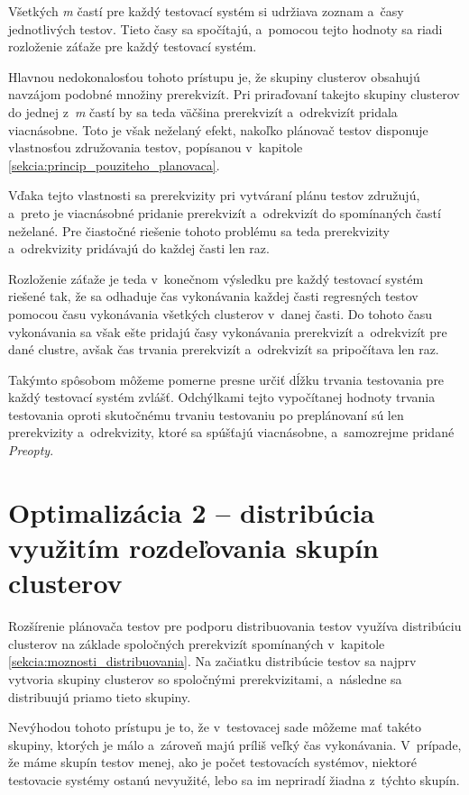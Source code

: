 Všetkých \textit{m} častí pre každý testovací systém si udržiava
zoznam a~časy jednotlivých testov. Tieto časy sa spočítajú, a~pomocou
tejto hodnoty sa riadi rozloženie záťaže pre každý testovací systém.

Hlavnou nedokonalosťou tohoto prístupu je, že skupiny clusterov obsahujú 
navzájom podobné množiny prerekvizít. Pri priraďovaní takejto skupiny clusterov
do jednej z~\textit{m} častí by sa teda väčšina prerekvizít a~odrekvizít
pridala viacnásobne. Toto je však neželaný efekt, nakoľko plánovač testov
disponuje vlastnosťou združovania testov, popísanou v~kapitole \ref{sekcia:princip_pouziteho_planovaca}.

Vďaka tejto vlastnosti sa prerekvizity pri vytváraní plánu testov združujú,
a~preto je viacnásobné pridanie prerekvizít a~odrekvizít do spomínaných častí neželané.
Pre čiastočné riešenie tohoto problému sa teda prerekvizity a~odrekvizity
pridávajú do každej časti len raz. 

Rozloženie záťaže je teda v~konečnom výsledku pre každý testovací systém 
riešené tak, že sa odhaduje čas vykonávania každej časti regresných testov
pomocou času vykonávania všetkých clusterov v~danej časti. Do tohoto času vykonávania 
sa však ešte pridajú časy vykonávania prerekvizít a~odrekvizít pre dané clustre,
avšak čas trvania prerekvizít a~odrekvizít sa pripočítava len raz.

Takýmto spôsobom môžeme pomerne presne určiť dĺžku trvania testovania
pre každý testovací systém zvlášť. Odchýlkami tejto vypočítanej hodnoty
trvania testovania oproti skutočnému trvaniu testovaniu po preplánovaní 
sú len prerekvizity a~odrekvizity, ktoré sa spúšťajú viacnásobne, a~samozrejme
pridané \textit{Preopty}. 


\section{Optimalizácia 2 -- distribúcia využitím rozdeľovania skupín clusterov}
\label{sekcia:optimalizacia2}
Rozšírenie plánovača testov pre podporu distribuovania testov využíva 
distribúciu clusterov na základe spoločných prerekvizít spomínaných v~kapitole 
\ref{sekcia:moznosti_distribuovania}.
Na začiatku distribúcie testov sa najprv vytvoria skupiny clusterov so spoločnými
prerekvizitami, a~následne sa distribuujú priamo tieto skupiny. 

Nevýhodou tohoto prístupu je to, že v~testovacej sade môžeme mať takéto skupiny,
ktorých je málo a~zároveň majú príliš veľký čas vykonávania. V~prípade, že máme
skupín testov menej, ako je počet testovacích systémov, niektoré testovacie 
systémy ostanú nevyužité, lebo sa im nepriradí žiadna z~týchto skupín.

